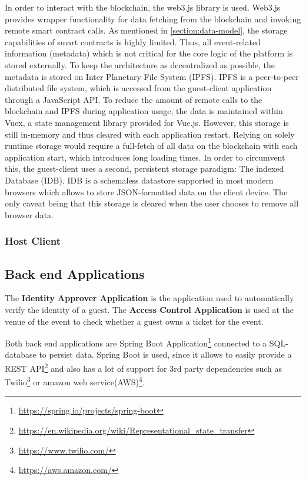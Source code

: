 In order to interact with the blockchain, the web3.js library is used. Web3.js provides wrapper functionality for data fetching from the blockchain and invoking remote smart contract calls. 
As mentioned in \ref{section:data-model}, the storage capabilities of smart contracts is highly limited. Thus, all event-related information (metadata) which is not critical for the core logic of the platform is stored externally. To keep the architecture as decentralized as possible, the metadata is stored on Inter Planetary File System (IPFS). IPFS is a peer-to-peer distributed file system, which is accessed from the guest-client application through a JavaScript API. To reduce the amount of remote calls to the blockchain and IPFS during application usage, the data is maintained within Vuex, a state management library provided for Vue.js. However, this storage is still in-memory and thus cleared with each application restart. Relying on solely runtime storage would require a full-fetch of all data on the blockchain with each application start, which introduces long loading times. In order to circumvent this, the guest-client uses a second, persistent storage paradigm: The indexed Database (IDB). IDB is a schemaless datastore supported in most modern browsers which allows to store JSON-formatted data on the client device. The only caveat being that this storage is cleared when the user chooses to remove all browser data.

\subsubsection{Host Client}

\subsection{Back end Applications}

The \textbf{Identity Approver Application} is the application used to automatically verify the identity of a guest. The \textbf{Access Control Application} is used at the venue of the event to check whether a guest owns a ticket for the event. 
 
Both back end applications are Spring Boot Application\footnote{\url{https://spring.io/projects/spring-boot}} connected to a SQL-database to persist data. Spring Boot is used, since it allows to easily provide a REST API\footnote{\url{https://en.wikipedia.org/wiki/Representational_state_transfer}} and also has a lot of support for 3rd party dependencies such as Twilio\footnote{\url{https://www.twilio.com/}} or amazon web service(AWS)\footnote{\url{https://aws.amazon.com/}}.

